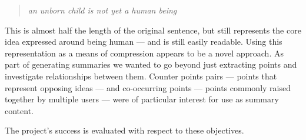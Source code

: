     \medskip
    \begin{center}
    \blockquote{\textit{an unborn child is not yet a human being}}
    \end{center}
    \medskip

    This is almost half the length of the original sentence, but still represents the core idea expressed around being human --- and is still easily readable. Using this representation as a means of compression appears to be a novel approach. As part of generating summaries we wanted to go beyond just extracting points and investigate relationships between them. Counter points pairs --- points that represent opposing ideas --- and co-occurring points --- points commonly raised together by multiple users --- were of particular interest for use as summary content.

    \medskip

    The project's success is evaluated with respect to these objectives.
